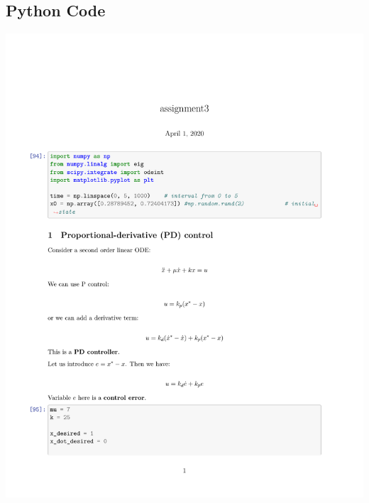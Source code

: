 \documentclass{article}
\begin{document}
\begin{appendices}
\section{Python Code}
\label{appendix:code}
\includegraphics[page=1,width=\textwidth]{code/python.pdf}
    
\end{appendices}
\end{document}
